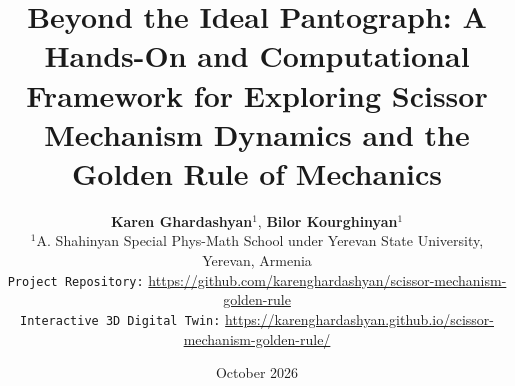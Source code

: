 \documentclass[10pt,twocolumn]{article}
\begin{document}
\title{\textbf{\Large Beyond the Ideal Pantograph: A Hands-On and Computational Framework for Exploring Scissor Mechanism Dynamics and the Golden Rule of Mechanics}}

\author{
    \textbf{Karen Ghardashyan}$^{1}$, \quad \textbf{Bilor Kourghinyan}$^{1}$ \\[0.5em]
    \small $^{1}$A. Shahinyan Special Phys-Math School under Yerevan State University, Yerevan, Armenia \\
    \small \texttt{Project Repository:} \url{https://github.com/karenghardashyan/scissor-mechanism-golden-rule} \\
    \small \texttt{Interactive 3D Digital Twin:} \url{https://karenghardashyan.github.io/scissor-mechanism-golden-rule/}
}

\date{\small October 2026}
\end{document}
